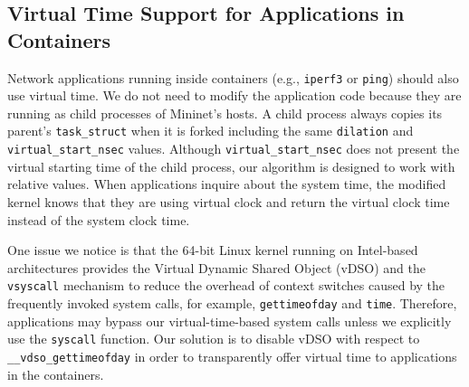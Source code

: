 \subsection{Virtual Time Support for Applications in Containers}
\label{Sub-Sec-ModificationApplications}
Network applications running inside containers (e.g., \texttt{iperf3}\cite{iperf3} or \texttt{ping}) should also use virtual time. We do not need to modify the application code because they are running as child processes of Mininet's hosts. A child process always copies its parent's \texttt{task\_struct} when it is forked including the same \texttt{dilation} and \texttt{virtual\_start\_nsec} values. Although \texttt{virtual\_start\_nsec} does not present the virtual starting time of the child process, our algorithm is designed to work with relative values. When applications inquire about the system time, the modified kernel knows that they are using virtual clock and return the virtual clock time instead of the system clock time.

One issue we notice is that the 64-bit Linux kernel running on Intel-based architectures provides the Virtual Dynamic Shared Object (vDSO) and the \texttt{vsyscall} mechanism to reduce the overhead of context switches caused by the frequently invoked system calls, for example, \texttt{gettimeofday} and \texttt{time}\cite{VDSO}. Therefore, applications may bypass our virtual-time-based system calls unless we explicitly use the \texttt{syscall} function. Our solution is to disable vDSO with respect to \texttt{\_\_vdso\_gettimeofday} in order to transparently offer virtual time to applications in the containers.
